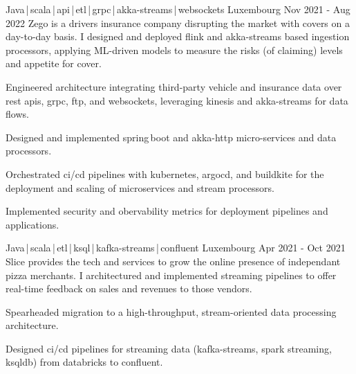 \begin{cventries}

    \cventry
    {Java\,|\,scala\,|\,api\,|\,etl\,|\,grpc\,|\,akka-streams\,|\,websockets}
    {} 
    {Luxembourg}
    {Nov 2021 - Aug 2022}
    {Zego is a drivers insurance company disrupting the market with covers on a day-to-day basis. I designed and deployed flink and akka-streams based ingestion processors, applying ML-driven models to measure the risks (of claiming) levels and appetite for cover.}
    {
        \begin{cvitems}
            \item{Engineered architecture integrating third-party vehicle and insurance data over rest apis, grpc, ftp, and websockets, leveraging kinesis and akka-streams for data flows.}
            \item{Designed and implemented spring\,boot and akka-http micro-services and data processors.}
            \item{Orchestrated ci/cd pipelines with kubernetes, argocd, and buildkite for the deployment and scaling of microservices and stream processors.}
            \item{Implemented security and obervability metrics for deployment pipelines and applications.}
        \end{cvitems}
    }


    \cventry
    {Java\,|\,scala\,|\,etl\,|\,ksql\,|\,kafka-streams\,|\,confluent}
    {} 
    {Luxembourg}
    {Apr 2021 - Oct 2021}
    {Slice provides the tech and services to grow the online presence of independant pizza merchants. I architectured and implemented streaming pipelines to offer real-time feedback on sales and revenues to those vendors.}
    {
        \begin{cvitems}
            \item{Spearheaded migration to a high-throughput, stream-oriented data processing architecture.}
            \item{Designed ci/cd pipelines for streaming data (kafka-streams, spark streaming, ksqldb) from databricks to confluent.}
        \end{cvitems}
    }


\end{cventries}
